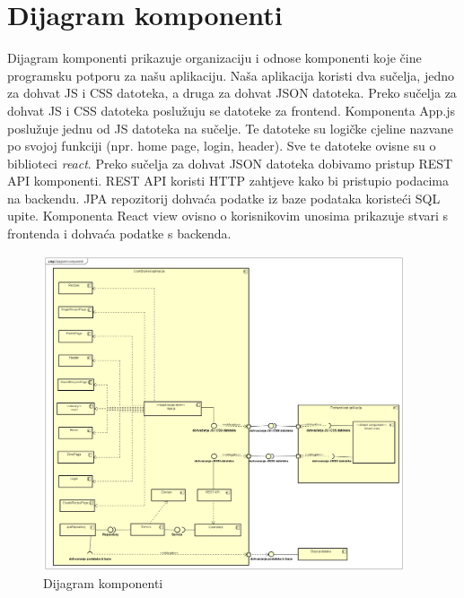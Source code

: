 			\eject

		\section{Dijagram komponenti}
		
		\noindent Dijagram komponenti prikazuje organizaciju i odnose komponenti koje čine programsku potporu za našu aplikaciju. Naša aplikacija koristi dva sučelja, jedno za dohvat JS i CSS datoteka, a druga za dohvat JSON datoteka. Preko sučelja za dohvat JS i CSS datoteka poslužuju se datoteke za frontend. Komponenta App.js poslužuje jednu od JS datoteka na sučelje. Te datoteke su logičke cjeline nazvane po svojoj funkciji (npr. home page, login, header). Sve te datoteke ovisne su o biblioteci \textit{react}. Preko sučelja za dohvat JSON datoteka dobivamo pristup REST API komponenti. REST API koristi HTTP zahtjeve kako bi pristupio podacima na backendu. JPA repozitorij dohvaća podatke iz baze podataka koristeći SQL upite. Komponenta React view ovisno o korisnikovim unosima prikazuje stvari s frontenda i dohvaća podatke s backenda.
			
			\begin{figure}[H]
				\centering
				\includegraphics[width=0.95\textwidth]{slike/dijagrami/Dijagram komponenti.png}
				\caption{Dijagram komponenti}
				\label{fig:enter-label}
			\end{figure}